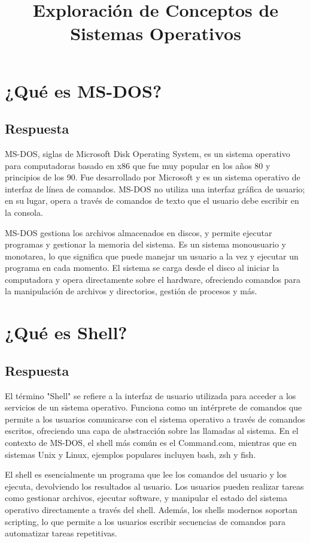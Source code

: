 \documentclass{article}
\title{Exploración de Conceptos de Sistemas Operativos}
\author{}
\date{}
\begin{document}
\maketitle

\section{¿Qué es MS-DOS?}
\subsection{Respuesta}
MS-DOS, siglas de Microsoft Disk Operating System, es un sistema operativo para computadoras basado en x86 que fue muy popular en los años 80 y principios de los 90. Fue desarrollado por Microsoft y es un sistema operativo de interfaz de línea de comandos. MS-DOS no utiliza una interfaz gráfica de usuario; en su lugar, opera a través de comandos de texto que el usuario debe escribir en la consola.

MS-DOS gestiona los archivos almacenados en discos, y permite ejecutar programas y gestionar la memoria del sistema. Es un sistema monousuario y monotarea, lo que significa que puede manejar un usuario a la vez y ejecutar un programa en cada momento. El sistema se carga desde el disco al iniciar la computadora y opera directamente sobre el hardware, ofreciendo comandos para la manipulación de archivos y directorios, gestión de procesos y más.

\section{¿Qué es Shell?}
\subsection{Respuesta}
El término "Shell" se refiere a la interfaz de usuario utilizada para acceder a los servicios de un sistema operativo. Funciona como un intérprete de comandos que permite a los usuarios comunicarse con el sistema operativo a través de comandos escritos, ofreciendo una capa de abstracción sobre las llamadas al sistema. En el contexto de MS-DOS, el shell más común es el Command.com, mientras que en sistemas Unix y Linux, ejemplos populares incluyen bash, zsh y fish.

El shell es esencialmente un programa que lee los comandos del usuario y los ejecuta, devolviendo los resultados al usuario. Los usuarios pueden realizar tareas como gestionar archivos, ejecutar software, y manipular el estado del sistema operativo directamente a través del shell. Además, los shells modernos soportan scripting, lo que permite a los usuarios escribir secuencias de comandos para automatizar tareas repetitivas.
\end{document}
